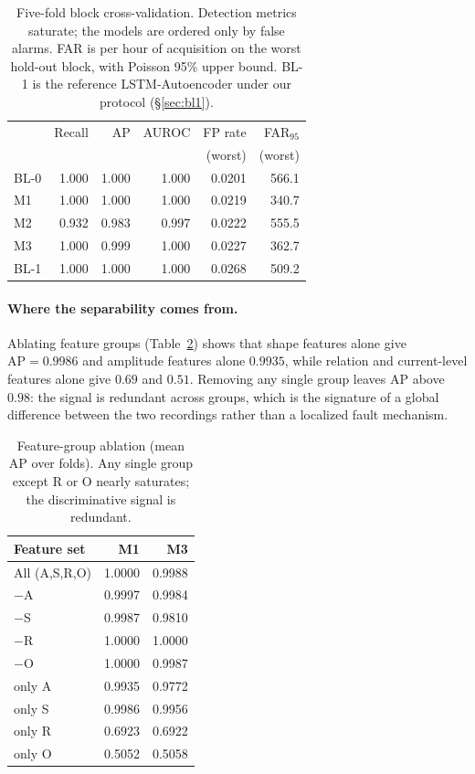 \documentclass{article}
\begin{document}
\begin{table}[t]
\caption{Five-fold block cross-validation. Detection metrics saturate; the
models are ordered only by false alarms. FAR is per hour of acquisition on the
worst hold-out block, with Poisson 95\% upper bound. BL-1 is the reference
LSTM-Autoencoder under our protocol (\S\ref{sec:bl1}).}
\label{tab:e2}
\vskip 0.08in
\centering
\small
\setlength{\tabcolsep}{4pt}
\begin{tabular}{lrrrrr}
\toprule
 & Recall & AP & AUROC & FP rate & FAR$_{95}$ \\
 &  &  &  & (worst) & (worst) \\
\midrule
BL-0 & 1.000 & 1.000 & 1.000 & 0.0201 & 566.1 \\
M1   & 1.000 & 1.000 & 1.000 & 0.0219 & 340.7 \\
M2   & 0.932 & 0.983 & 0.997 & 0.0222 & 555.5 \\
M3   & 1.000 & 0.999 & 1.000 & 0.0227 & 362.7 \\
BL-1 & 1.000 & 1.000 & 1.000 & 0.0268 & 509.2 \\
\bottomrule
\end{tabular}
\end{table}

\paragraph{Where the separability comes from.} Ablating feature groups
(Table~\ref{tab:e4}) shows that shape features alone give
$\mathrm{AP}=0.9986$ and amplitude features alone $0.9935$, while relation and
current-level features alone give $0.69$ and $0.51$. Removing any single group
leaves AP above $0.98$: the signal is redundant across groups, which is the
signature of a global difference between the two recordings rather than a
localized fault mechanism.

\begin{table}[t]
\caption{Feature-group ablation (mean AP over folds). Any single group except
R or O nearly saturates; the discriminative signal is redundant.}
\label{tab:e4}
\vskip 0.08in
\centering
\small
\begin{tabular}{lrr}
\toprule
Feature set & M1 & M3 \\
\midrule
All (A,S,R,O) & 1.0000 & 0.9988 \\
$-$A          & 0.9997 & 0.9984 \\
$-$S          & 0.9987 & 0.9810 \\
$-$R          & 1.0000 & 1.0000 \\
$-$O          & 1.0000 & 0.9987 \\
only A        & 0.9935 & 0.9772 \\
only S        & 0.9986 & 0.9956 \\
only R        & 0.6923 & 0.6922 \\
only O        & 0.5052 & 0.5058 \\
\bottomrule
\end{tabular}
\end{table}
\end{document}
